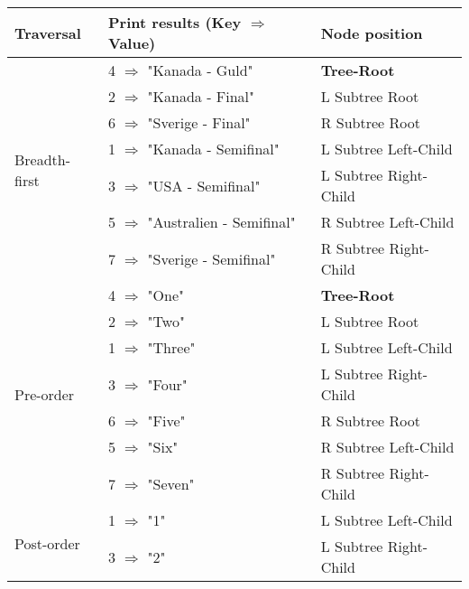 \documentclass[a4paper, 11pt]{article}
\begin{document}
    \begin{table}[h]
        \small
        \centering
    \begin{tabular}{|l|l|l|}
        \hline
        \textbf{Traversal}           & \textbf{Print results} (Key $\Rightarrow$ Value)  & \textbf{Node position}\\
        \hline\hline
        \multirow{7}{*}{Breadth-first}& 4 $\Rightarrow$ "Kanada - Guld"         & \textbf{Tree-Root} \\
                                      & 2 $\Rightarrow$ "Kanada - Final"        & L Subtree Root\\
                                      & 6 $\Rightarrow$ "Sverige - Final"       & R Subtree Root\\
                                      & 1 $\Rightarrow$ "Kanada - Semifinal"    & L Subtree Left-Child\\
                                      & 3 $\Rightarrow$ "USA - Semifinal"       & L Subtree Right-Child\\
                                      & 5 $\Rightarrow$ "Australien - Semifinal" & R Subtree Left-Child\\
                                      & 7 $\Rightarrow$ "Sverige - Semifinal"    & R Subtree Right-Child\\
        \hline
        \multirow{7}{*}{Pre-order}    & 4 $\Rightarrow$ "One"       & \textbf{Tree-Root} \\ %
                                      & 2 $\Rightarrow$ "Two"       & L Subtree Root\\
                                      & 1 $\Rightarrow$ "Three"     & L Subtree Left-Child\\
                                      & 3 $\Rightarrow$ "Four"      & L Subtree Right-Child\\
                                      & 6 $\Rightarrow$ "Five"      & R Subtree Root\\\
                                      & 5 $\Rightarrow$ "Six"       & R Subtree Left-Child\\
                                      & 7 $\Rightarrow$ "Seven"     & R Subtree Right-Child\\
        \hline
        \multirow{7}{*}{Post-order}   & 1 $\Rightarrow$ "1"         & L Subtree Left-Child\\
                                      & 3 $\Rightarrow$ "2"         & L Subtree Right-Child\\

\end{tabular}
\end{table}
\end{document}
